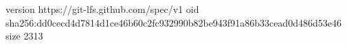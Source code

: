 version https://git-lfs.github.com/spec/v1
oid sha256:dd0cecd4d7814d1ce46b60c2fc932990b82be943f91a86b33cead0d486d53e46
size 2313
